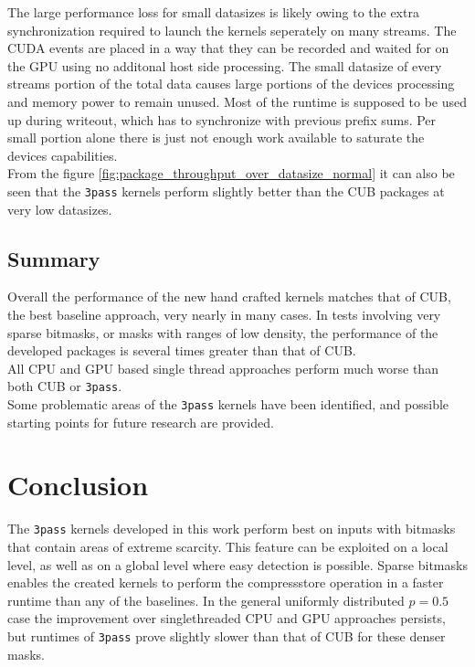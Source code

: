\documentclass{tudscrreprt}
\begin{document}
			The large performance loss for small datasizes is likely owing to the extra synchronization required to launch the kernels seperately on many streams. The CUDA events are placed in a way that they can be recorded and waited for on the GPU using no additonal host side processing. The small datasize of every streams portion of the total data causes large portions of the devices processing and memory power to remain unused. Most of the runtime is supposed to be used up during writeout, which has to synchronize with previous prefix sums. Per small portion alone there is just not enough work available to saturate the devices capabilities. \\
			
			From the figure \ref{fig:package_throughput_over_datasize_normal} it can also be seen that the \texttt{3pass} kernels perform slightly better than the CUB packages at very low datasizes. \\
		
		\section{Summary}
			Overall the performance of the new hand crafted kernels matches that of CUB, the best baseline approach, very nearly in many cases. In tests involving very sparse bitmasks, or masks with ranges of low density, the performance of the developed packages is several times greater than that of CUB. \\
			All CPU and GPU based single thread approaches perform much worse than both CUB or \texttt{3pass}. \\
			
			Some problematic areas of the \texttt{3pass} kernels have been identified, and possible starting points for future research are provided. \\
		
	\chapter{Conclusion}
		The \texttt{3pass} kernels developed in this work perform best on inputs with bitmasks that contain areas of extreme scarcity. This feature can be exploited on a local level, as well as on a global level where easy detection is possible. Sparse bitmasks enables the created kernels to perform the compressstore operation in a faster runtime than any of the baselines. In the general uniformly distributed $p=0.5$ case the improvement over singlethreaded CPU and GPU approaches persists, but runtimes of \texttt{3pass} prove slightly slower than that of CUB for these denser masks. \\
		
\end{document}
